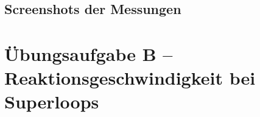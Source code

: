 \documentclass{article}
\newcommand{\bild}[3]{\begin{figure}[h!]		\begin{center}			\texttt{[image: \#1]}			\caption{#2}		\end{center}	\end{figure}}
\begin{document}
\subsection{Screenshots der Messungen }


\section{Übungsaufgabe B – Reaktionsgeschwindigkeit bei Superloops}

\end{document}
